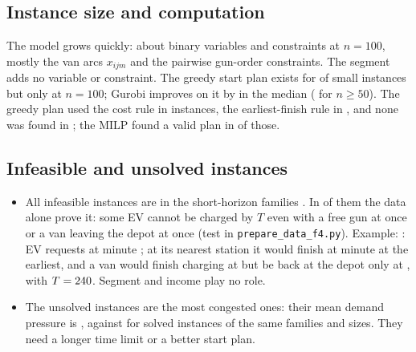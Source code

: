 \subsection{Instance size and computation}
\label{sec:computation}
\begin{table}[H]
\centering\small
\caption{Model size and solver behaviour by instance size (medians over the 56 instances of each size).}
\label{tab:model}

\end{table}
The model grows quickly: about \BinHundred{} binary variables and \ConsHundred{} constraints at $n=100$, mostly the van arcs $x_{ijm}$ and the pairwise gun-order constraints. The segment adds no variable or constraint. The greedy start plan exists for \GreedyFoundSmall\pct{} of small instances but only \GreedyFoundBig\pct{} at $n=100$; Gurobi improves on it by \GreedyGainMed\pct{} in the median (\GreedyGainBigMed\pct{} for $n\ge50$). The greedy plan used the cost rule in \WarmCost{} instances, the earliest-finish rule in \WarmFinish, and none was found in \WarmNone; the MILP found a valid plan in \ValidNoWarm{} of those.


\subsection{Infeasible and unsolved instances}
\label{sec:infeasible}
\begin{table}[H]
\centering\small
\caption{Infeasible instances (Gurobi's verdict) and how many the data test alone proves infeasible.}
\label{tab:infeasible}

\end{table}
\begin{table}[H]
\centering\small
\caption{Unsolved instances (no plan in the time limit) and their demand pressure.}
\label{tab:unsolved}

\end{table}
\begin{itemize}
  \item All \NInf{} infeasible instances are in the short-horizon families \InfFamilies. In \NInfData{} of them the data alone prove it: some EV cannot be charged by $T$ even with a free gun at once or a van leaving the depot at once (test in \texttt{prepare\_data\_f4.py}). Example: \InfExample: EV \InfExampleEV{} requests at minute \InfExampleR; at its nearest station it would finish at minute \InfExampleFinish{} at the earliest, and a van would finish charging at \InfExampleVanEnd{} but be back at the depot only at \InfExampleVanBack, with $T=240$. Segment and income play no role.
  \item The \NNone{} unsolved instances are the most congested ones: their mean demand pressure is \UnsolvedPressure, against \SolvedSamePressure{} for solved instances of the same families and sizes. They need a longer time limit or a better start plan.
\end{itemize}

